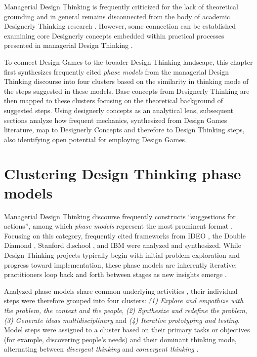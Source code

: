 \documentclass[draft,twoside]{vutinfth}
\begin{document}
        Managerial Design Thinking is frequently criticized for the lack of theoretical grounding and in general remains disconnected from the body 
        of academic Designerly Thinking research \cite{johansson-skoldbergDesignThinkingPresent2013a,nhuShortcomingsDesignThinking2019}. 
        However, some connection can be established examining core Designerly concepts embedded within practical processes presented in 
        managerial Design Thinking \cite{nhuShortcomingsDesignThinking2019}. 

        To connect Design Games to the broader Design Thinking landscape, this chapter first synthesizes frequently cited \textit{phase models} 
        from the managerial Design Thinking discourse into four clusters based on the similarity in thinking mode of the steps suggested in these models. 
        Base concepts from Designerly Thinking are then mapped to these clusters focusing on the theoretical background of suggested steps. Using 
        designerly concepts as an analytical lens, subsequent sections analyze how frequent mechanics, synthesized 
        from Design Games literature, map to Designerly Concepts and therefore to Design Thinking steps, also identifying open potential for 
        employing Design Games. 
        
        \section{Clustering Design Thinking phase models}
            Managerial Design Thinking discourse frequently constructs ``suggestions for actions'', among which \textit{phase models} represent the most prominent format 
            \cite{nhuShortcomingsDesignThinking2019}. Focusing on this category, frequently cited frameworks from IDEO \cite{brownDesignThinkingSocial2010,DesignThinkingIDEO}, 
            the Double Diamond \cite{DoubleDiamondDesign}, Stanford d.school \cite{micheliDoingDesignThinking2019}, and IBM \cite{micheliDoingDesignThinking2019} were analyzed and 
            synthesized. While Design Thinking projects typically begin with initial problem exploration and progress toward implementation, these phase models are inherently iterative; 
            practitioners loop back and forth between stages as new insights emerge \cite{brownDesignThinkingSocial2010,nhuShortcomingsDesignThinking2019}.

            Analyzed phase models share common underlying activities \cite{micheliDoingDesignThinking2019}, their individual steps were therefore grouped into four clusters: 
            \textit{(1) Explore and empathize with the problem, the context and the people}, \textit{(2) Synthesize and redefine the problem}, 
            \textit{(3) Generate ideas multidisciplinary} and \textit{(4) Iterative prototyping and testing}. 
            Model steps were assigned to a cluster based on their primary tasks or objectives (for example, discovering people's needs) 
            and their dominant thinking mode, alternating between \textit{divergent thinking} and \textit{convergent thinking} \cite{kolkoDivisivenessDesignThinking2018}. 
            
\end{document}
